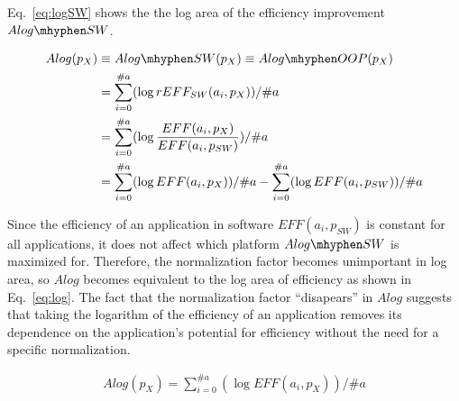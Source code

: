 Eq.~\eqref{eq:logSW} shows the the log area of the efficiency improvement $Alog\mhyphen SW$. 

\begingroup\makeatletter{}\check@mathfonts
\vspace{-8pt}
\begin{equation}
\begin{split}
	Alog(p_{X}) &\equiv Alog\mhyphen SW(p_{X}) \equiv Alog\mhyphen OOP(p_{X}) \\
	&= \sum_{i=0}^{\#a} ( \log rEFF_{SW}(a_{i}, p_{X}) ) / \#a  \\
	&= \sum_{i=0}^{\#a} ( \log \frac{EFF(a_{i}, p_{X})}{EFF(a_{i}, p_{SW})}) / \#a \\
	&= \sum_{i=0}^{\#a} ( \log EFF(a_{i}, p_{X}) ) / \#a - \sum_{i=0}^{\#a} ( \log EFF(a_i, p_{SW}) ) / \#a
\label{eq:logDetial}
\end{split}
\end{equation}
\endgroup

Since the efficiency of an application in software $EFF(a_i, p_{SW})$ is constant for all applications, it does not affect which platform $Alog\mhyphen SW$ is maximized for. Therefore, the normalization factor becomes unimportant in log area, so $Alog$ becomes equivalent to the log area of efficiency as shown in Eq.~\eqref{eq:log}. The fact that the normalization factor ``disapears'' in $Alog$ suggests that taking the logarithm of the efficiency of an application removes its dependence on the application's potential for efficiency without the need for a specific normalization. 


\begingroup\makeatletter{}\check@mathfonts
\vspace{-8pt}
\begin{equation}
\begin{split}
	Alog(p_{X}) = \sum_{i=0}^{\#a} ( \log EFF(a_{i}, p_{X}) ) / \#a	
\end{split}
\label{eq:log}
\end{equation}
\endgroup